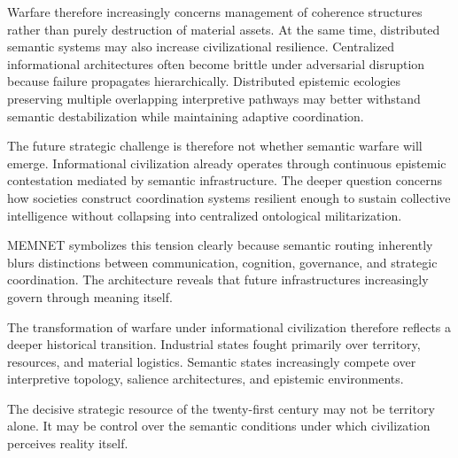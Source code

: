 \documentclass[11pt,a4paper]{article}
\begin{document}
Warfare therefore increasingly concerns management of coherence structures rather than purely destruction of material assets. At the same time, distributed semantic systems may also increase civilizational resilience. Centralized informational architectures often become brittle under adversarial disruption because failure propagates hierarchically. Distributed epistemic ecologies preserving multiple overlapping interpretive pathways may better withstand semantic destabilization while maintaining adaptive coordination.

The future strategic challenge is therefore not whether semantic warfare will emerge. Informational civilization already operates through continuous epistemic contestation mediated by semantic infrastructure. The deeper question concerns how societies construct coordination systems resilient enough to sustain collective intelligence without collapsing into centralized ontological militarization.

MEMNET symbolizes this tension clearly because semantic routing inherently blurs distinctions between communication, cognition, governance, and strategic coordination. The architecture reveals that future infrastructures increasingly govern through meaning itself.

The transformation of warfare under informational civilization therefore reflects a deeper historical transition. Industrial states fought primarily over territory, resources, and material logistics. Semantic states increasingly compete over interpretive topology, salience architectures, and epistemic environments.

The decisive strategic resource of the twenty-first century may not be territory alone. It may be control over the semantic conditions under which civilization perceives reality itself.
\end{document}
